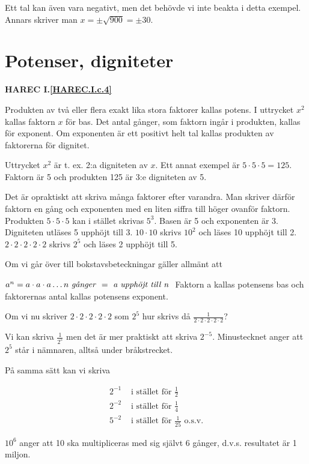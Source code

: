 Ett tal kan även vara negativt, men det behövde vi inte beakta i detta exempel.
Annars skriver man \(x = \pm \sqrt{900} = \pm 30\).

\section{Potenser, digniteter}
\textbf{HAREC I.\ref{HAREC.I.c.4}\label{myHAREC.I.c.4}}

Produkten av två eller flera exakt lika stora faktorer kallas potens. I
uttrycket \(x^2\) kallas faktorn \(x\) för bas. Det antal gånger, som faktorn ingår
i produkten, kallas för exponent. Om exponenten är ett positivt helt tal
kallas produkten av faktorerna för dignitet.

Uttrycket \(x^2\) är t. ex. 2:a digniteten av \(x\).
Ett annat exempel är \(5 \cdot 5 \cdot 5 = 125\).
Faktorn är 5 och produkten 125 är 3:e digniteten av 5.

Det är opraktiskt att skriva många faktorer efter varandra. Man skriver därför
faktorn en gång och exponenten med en liten siffra till höger ovanför faktorn.
Produkten \(5 \cdot 5 \cdot 5\) kan i stället skrivas \(5^3\).
Basen är 5 och exponenten är 3. Digniteten utläses 5 upphöjt till 3.
\(10 \cdot 10\) skrivs \(10^2\) och läses 10 upphöjt till 2.
\(2 \cdot 2 \cdot 2 \cdot 2 \cdot 2\) skrivs \(2^5\) och läses 2 upphöjt
till 5.

Om vi går över till bokstavsbeteckningar gäller allmänt att

\(a^n= a \cdot a \cdot a \ldots n \textrm{ \emph{g{\aa}nger} } = \textrm{ \emph{a
  upphöjt till n} }\) 
Faktorn a kallas potensens bas och faktorernas antal kallas potensens exponent.

Om vi nu skriver \(2 \cdot 2 \cdot 2 \cdot 2 \cdot 2\) som \(2^5\) hur skrivs då
\(\frac{1}{2 \cdot 2 \cdot 2 \cdot 2 \cdot 2}\)?

Vi kan skriva \(\frac{1}{2^5}\) men det är mer praktiskt att skriva \(2^{-5}\).
Minustecknet anger att \(2^5\) står i nämnaren, alltså under bråkstrecket.

På samma sätt kan vi skriva

\begin{align*}
2^{-1} & \text{ i stället för } \frac{1}{2} \\
2^{-2} & \text{ i stället för } \frac{1}{4} \\
5^{-2} & \text{ i stället för } \frac{1}{25} \text{ o.s.v.}
\end{align*}


\(10^6\) anger att 10 ska multipliceras med sig självt 6 gånger, d.v.s.
resultatet är 1 miljon.

